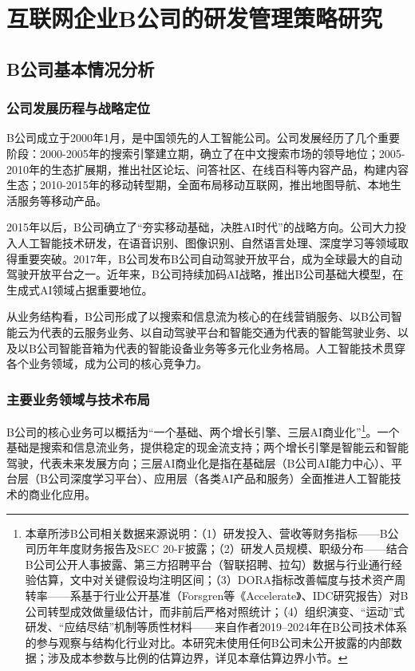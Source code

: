 
\chapter{互联网企业B公司的研发管理策略研究}

\section{B公司基本情况分析}

\subsection{公司发展历程与战略定位}

B公司成立于2000年1月，是中国领先的人工智能公司。公司发展经历了几个重要阶段：2000-2005年的搜索引擎建立期，确立了在中文搜索市场的领导地位；2005-2010年的生态扩展期，推出社区论坛、问答社区、在线百科等内容产品，构建内容生态；2010-2015年的移动转型期，全面布局移动互联网，推出地图导航、本地生活服务等移动产品。

2015年以后，B公司确立了“夯实移动基础，决胜AI时代”的战略方向\cite{li2024scientific}。公司大力投入人工智能技术研发，在语音识别、图像识别、自然语言处理、深度学习等领域取得重要突破\cite{dou2018darpa}。2017年，B公司发布B公司自动驾驶开放平台，成为全球最大的自动驾驶开放平台之一。近年来，B公司持续加码AI战略，推出B公司基础大模型，在生成式AI领域占据重要地位\cite{pan2021transforming}。

从业务结构看，B公司形成了以搜索和信息流为核心的在线营销服务、以B公司智能云为代表的云服务业务、以自动驾驶平台和智能交通为代表的智能驾驶业务、以及以B公司智能音箱为代表的智能设备业务等多元化业务格局。人工智能技术贯穿各个业务领域，成为公司的核心竞争力。

\subsection{主要业务领域与技术布局}

B公司的核心业务可以概括为“一个基础、两个增长引擎、三层AI商业化”\footnote{本章所涉B公司相关数据来源说明：（1）研发投入、营收等财务指标——B公司历年年度财务报告及SEC 20-F披露；（2）研发人员规模、职级分布——结合B公司公开人事披露、第三方招聘平台（智联招聘、拉勾）数据与行业通行经验估算，文中对关键假设均注明区间；（3）DORA指标改善幅度与技术资产周转率——系基于行业公开基准（Forsgren等《Accelerate》、IDC研究报告）对B公司转型成效做量级估计，而非前后严格对照统计；（4）组织演变、“运动”式研发、“应结尽结”机制等质性材料——来自作者2019--2024年在B公司技术体系的参与观察与结构化行业对比。本研究未使用任何B公司未公开披露的内部数据；涉及成本参数与比例的估算边界，详见本章估算边界小节。}。一个基础是搜索和信息流业务，提供稳定的现金流支持；两个增长引擎是智能云和智能驾驶，代表未来发展方向；三层AI商业化是指在基础层（B公司AI能力中心）、平台层（B公司深度学习平台）、应用层（各类AI产品和服务）全面推进人工智能技术的商业化应用。


